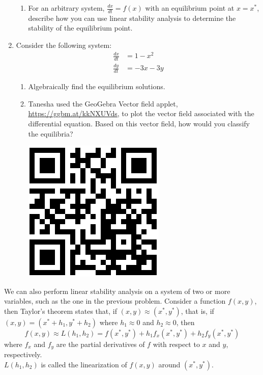 \begin{enumerate}[resume]
\begin{enumerate}
\item For an arbitrary system, $\displaystyle\frac{dx}{dt}=f(x)$ with an equilibrium point at $x=x^*$, describe how you can use linear stability analysis to determine the stability of the equilibrium point. \label{14problem8partd} \vfill
\end{enumerate}

\item Consider the following system: \label{14problem9}
\begin{align*}
\frac{dx}{dt} &= 1-x^2 \\
\frac{dy}{dt} &= -3x -3y
\end{align*}
\begin{enumerate}
\item Algebraically find the equilibrium solutions. \label{14problem9parta} \vfill
\item Tanesha used the GeoGebra Vector field applet, \href{https://ggbm.at/kkNXUVds}{\underline{https://ggbm.at/kkNXUVds}}, to plot the vector field associated with the differential equation.  Based on this vector field, how would you classify the equilibria? \label{14problem9partb}

\vspace{-.25in}\hspace{-.75in}\includegraphics[width=.5in]{14/14VectorFieldQR.png}
\vfill
\end{enumerate}
\end{enumerate}

\clearpage

We can also perform linear stability analysis on a system of two or more variables, such as the one in the previous problem. Consider a function $f(x,y)$, then Taylor's theorem states that, if $(x,y) \approx (x^*,y^*)$, that is, if $(x,y) = (x^*+h_1, y^*+h_2)$ where $h_1 \approx 0$ and $h_2 \approx 0$, then
\[
f(x,y) \approx L(h_1,h_2) = f(x^*,y^*) + h_1f_x(x^*,y^*) + h_2f_y(x^*,y^*)
\]
where $f_x$ and $f_y$ are the partial derivatives of $f$ with respect to $x$ and $y$, respectively. \\

$L(h_1,h_2)$ is called the linearization of $f(x,y)$ around $(x^*,y^*)$.

